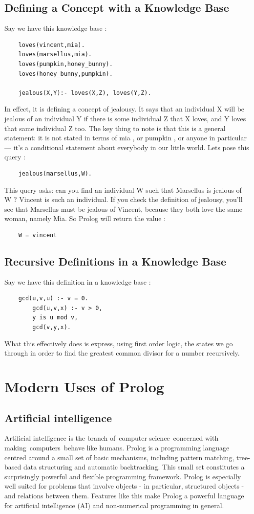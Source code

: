 \documentclass[14pt]{article}
\begin{document}
\subsection{Defining a Concept with a Knowledge Base}
Say we have this knowledge base :
\begin{verbatim}
	loves(vincent,mia).
	loves(marsellus,mia).
	loves(pumpkin,honey_bunny).
	loves(honey_bunny,pumpkin).

	jealous(X,Y):- loves(X,Z), loves(Y,Z).
\end{verbatim}
In effect, it is defining a concept of jealousy. It says that an 
individual X will be jealous of an individual Y if there is some 
individual Z that X loves, and Y loves that same individual Z too. The 
key thing to note is that this is a general statement: it is not stated 
in terms of mia , or pumpkin , or anyone in particular — it’s a 
conditional statement about everybody in our little world. Lets pose 
this query :
\begin{verbatim}
	jealous(marsellus,W).
\end{verbatim}
This query asks: can you find an individual W such that Marsellus is 
jealous of W ? Vincent is such an individual. If you check the definition of jealousy, you’ll see that Marsellus must be jealous of Vincent, because they both love the same woman, namely Mia. So Prolog will return the value :
\begin{verbatim}
	W = vincent
\end{verbatim}
\newpage 
\subsection{Recursive Definitions in a Knowledge Base}
Say we have this definition in a knowledge base :
\begin{verbatim}
	gcd(u,v,u) :- v = 0.
		gcd(u,v,x) :- v > 0,
		y is u mod v,
		gcd(v,y,x).
\end{verbatim}
What this effectively does is express, using first order logic, the 
states we go through in order to find the greatest common divisor 
for a number recursively. 
\newpage
\section{Modern Uses of Prolog}
\subsection{Artificial intelligence}

Artificial intelligence is the branch of computer science concerned with making computers behave like humans. Prolog is a programming language centred around a small set of basic mechanisms, including pattern matching, tree-based data structuring and automatic backtracking. This small set constitutes a surprisingly powerful and flexible programming framework. Prolog is especially well suited for problems that involve objects - in particular, structured objects - and relations between them. Features like this make Prolog a powerful language for artificial intelligence (AI) and non-numerical programming in general.
\end{document}
